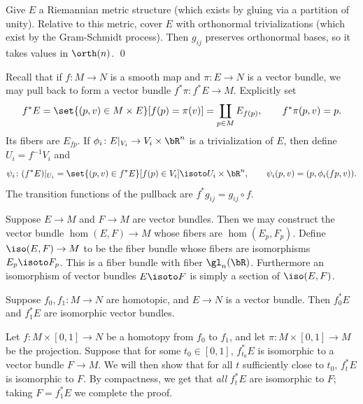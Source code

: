 \elemm

\bproof

    Give $E$ a Riemannian metric structure (which exists by gluing via a partition of unity).
    Relative to this metric, cover $E$ with orthonormal trivializations (which exist by the Gram-Schmidt process).
    Then $g_{ij}$ preserves orthonormal bases, so it takes values in $\orth(n)$.
    \qed

\eproof

Recall that if $f\colon M\to N$ is a smooth map and $\pi\colon E\to N$ is a vector bundle, we may pull back to form a vector bundle $f^*\pi\colon f^*E\to M$.
Explicitly set
$$ f^*E = \set{(p,v)\in M\times E}[f(p)=\pi(v)] = \coprod_{p\in M}E_{f(p)},\qquad f^*\pi(p,v) = p . $$
Its fibers are $E_{fp}$.
If $\phi_i\colon E|_{V_i}\to V_i\times\bR^n$ is a trivialization of $E$, then define $U_i=f^{-1}V_i$ and
$$ \psi_i\colon(f^*E)|_{U_i} = \set{(p,v)\in f^*E}[f(p)\in V_i] \isoto U_i\times\bR^n,\qquad \psi_i(p,v) = (p,\phi_i(fp,v)) . $$
The transition functions of the pullback are $f^*g_{ij}=g_{ij}\circ f$.

Suppose $E\to M$ and $F\to M$ are vector bundles.
Then we may construct the vector bundle $\hom(E,F)\to M$ whose fibers are $\hom(E_p,F_p)$.
Define $\iso(E,F)\to M$ to be the fiber bundle whose fibers are isomorphisms $E_p\isoto F_p$.
This is a fiber bundle with fiber $\gl_n(\bR)$.
Furthermore an isomorphism of vector bundles $E\isoto F$ is simply a section of $\iso(E,F)$.

\bprop[name={bundlehomotopy}]

    Suppose $f_0,f_1\colon M\to N$ are homotopic, and $E\to N$ is a vector bundle.
    Then $f_0^*E$ and $f_1^*E$ are isomorphic vector bundles.

\eprop

%
%

\bproof

    Let $f\colon M\times[0,1]\to N$ be a homotopy from $f_0$ to $f_1$, and let $\pi\colon M\times[0,1]\to M$ be the projection.
    Suppose that for some $t_0\in[0,1]$, $f_{t_0}^*E$ is isomorphic to a vector bundle $F\to M$.
    We will then show that for all $t$ sufficiently close to $t_0$, $f_t^*E$ is isomorphic to $F$.
    By compactness, we get that {\it all\/} $f_t^*E$ are isomorphic to $F$; taking $F=f_1^*E$ we complete the proof.

